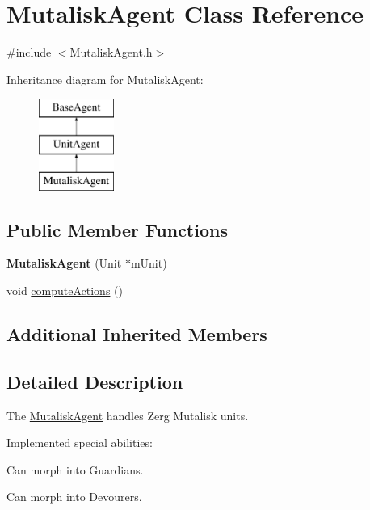 \hypertarget{class_mutalisk_agent}{\section{Mutalisk\-Agent Class Reference}
\label{class_mutalisk_agent}
}


{\ttfamily \#include $<$Mutalisk\-Agent.\-h$>$}

Inheritance diagram for Mutalisk\-Agent\-:\begin{figure}[H]
\begin{center}
\leavevmode
\includegraphics[height=3.000000cm]{class_mutalisk_agent}
\end{center}
\end{figure}
\subsection*{Public Member Functions}
\begin{DoxyCompactItemize}
\item 
\hypertarget{class_mutalisk_agent_a9b8d8cdf37aa9e3ca54d668e10b4fb74}{{\bfseries Mutalisk\-Agent} (Unit $\ast$m\-Unit)}\label{class_mutalisk_agent_a9b8d8cdf37aa9e3ca54d668e10b4fb74}

\item 
void \hyperlink{class_mutalisk_agent_a7845c4837ba3f84da6318c2bc7910867}{compute\-Actions} ()
\end{DoxyCompactItemize}
\subsection*{Additional Inherited Members}


\subsection{Detailed Description}
The \hyperlink{class_mutalisk_agent}{Mutalisk\-Agent} handles Zerg Mutalisk units.

Implemented special abilities\-:
\begin{DoxyItemize}
\item Can morph into Guardians.
\item Can morph into Devourers.
\end{DoxyItemize}

